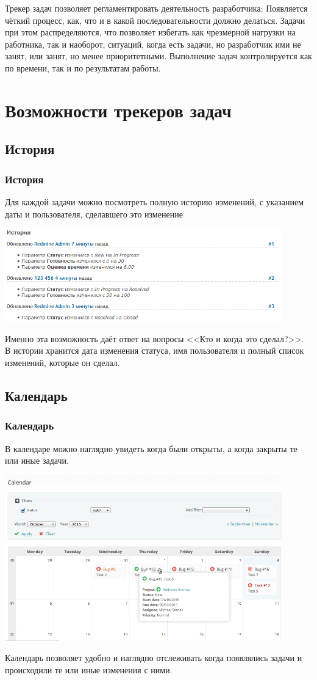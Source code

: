 \documentclass{../industrial-development}
\begin{document}
\lecturenotes

Трекер задач позволяет регламентировать деятельность разработчика:
Появляется чёткий процесс, как, что и в какой последовательности должно делаться.
Задачи при этом распределяются, что позволяет избегать как чрезмерной нагрузки на работника, так и наоборот, ситуаций, когда есть задачи, но разработчик ими не занят, или занят, но менее приоритетными.
Выполнение задач контролируется как по времени, так и по результатам работы.

\section{Возможности трекеров задач}
\subsection{История}
\begin{frame} \frametitle{История}
Для каждой задачи можно посмотреть полную историю изменений, с указанием даты и пользователя, сделавшего это изменение
\centerline{\includegraphics[width=0.9\textwidth]{history.png}}
\end{frame}
\lecturenotes
Именно эта возможность даёт ответ на вопросы <<Кто и когда это сделал?>>.
В истории хранится дата изменения статуса, имя пользователя и полный список изменений, которые он сделал.

\subsection{Календарь}
\begin{frame} \frametitle{Календарь}
В календаре можно наглядно увидеть когда были открыты, а когда закрыты те или иные задачи.
\centerline{\includegraphics[width=0.9\textwidth]{calendar.png}}
\end{frame}
\lecturenotes
Календарь позволяет удобно и наглядно отслеживать когда появлялись задачи и происходили те или иные изменения с ними.
\end{document}

